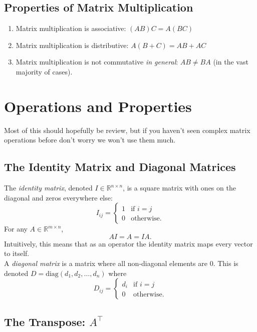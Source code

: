 \documentclass{article}
\newcommand{\1}{\mathbf{1}}
\newcommand{\0}{\mathbf{0}}
\newcommand{\RR}{\mathbb{R}}
\newcommand{\T}{\top}
\begin{document}
\subsection{Properties of Matrix Multiplication}

\begin{enumerate}[-]
    \item Matrix multiplication is associative: $(AB)C = A(BC)$
    \item Matrix multiplication is distributive: $A(B+C) = AB + AC$
    \item Matrix multiplication is not commutative \textit{in general}:
        $AB \neq BA$ (in the vast majority of cases).
\end{enumerate}

\section{Operations and Properties}

Most of this should hopefully be review, but if you haven't seen complex matrix operations
before don't worry we won't use them much.

\subsection{The Identity Matrix and Diagonal Matrices}

The \textit{identity matrix}, denoted $I\in\RR^{n\times n}$, is a square matrix
with ones on the diagonal and zeros everywhere else:
\[
    I_{ij} = \begin{cases} 1 & \text{if $i=j$}\\
        0 & \text{otherwise.}
    \end{cases}
\]
For any $A\in\RR^{m\times n}$,
\[
    AI = A = IA.
\]
Intuitively, this means that as an operator the identity matrix maps every
vector to itself.\\

A \textit{diagonal matrix} is a matrix where all non-diagonal elements are 0.
This is denoted $D=\mathrm{diag}(d_1,d_2,\dots,d_n)$ where
\[
    D_{ij} = \begin{cases}
        d_i & \text{if $i=j$}\\
        0 & \text{otherwise.}
    \end{cases}
\]

\subsection{The Transpose: $A^\T$}
\end{document}
